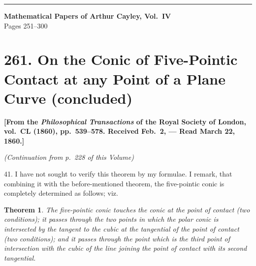 \documentclass[11pt,a4paper]{book}
\newtheorem*{theorem}{Theorem}
\begin{document}
\vspace{2em}

\noindent\rule{\textwidth}{0.4pt}

\medskip

\clearpage


\begin{center}
\Large\textbf{Mathematical Papers of Arthur Cayley, Vol.~IV}\\[6pt]
\large Pages 251--300
\end{center}


\newpage

\section[261. On the Conic of Five-Pointic Contact]{261. On the Conic of Five-Pointic Contact at any Point of a Plane Curve (concluded)}

\textbf{[From the \textit{Philosophical Transactions} of the Royal Society of London, vol.~CL (1860), pp.~539--578. Received Feb.~2, --- Read March 22, 1860.]}

\vspace{6pt}

\noindent\textit{(Continuation from p.~228 of this Volume)}

\vspace{6pt}

41. I have not sought to verify this theorem by my formulae. I remark, that combining it with the before-mentioned theorem, the five-pointic conic is completely determined as follows; viz.

\begin{theorem}
The five-pointic conic touches the conic at the point of contact (two conditions); it passes through the two points in which the polar conic is intersected by the tangent to the cubic at the tangential of the point of contact (two conditions); and it passes through the point which is the third point of intersection with the cubic of the line joining the point of contact with its second tangential.
\end{theorem}
\end{document}
